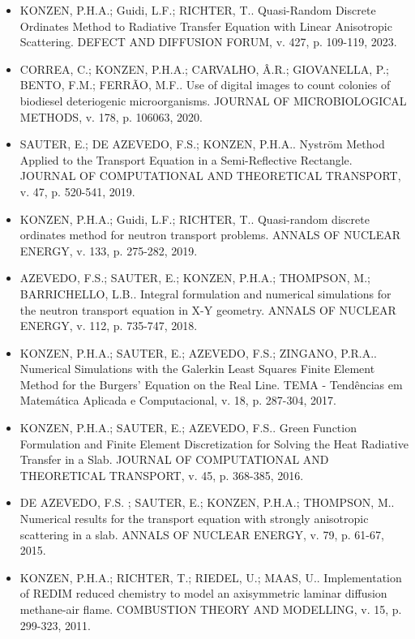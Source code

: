 \documentclass[a4paper,12pt]{article}
\begin{document}
\begin{itemize}
\item KONZEN, P.H.A.; Guidi, L.F.; RICHTER, T.. Quasi-Random Discrete Ordinates Method to Radiative Transfer Equation with Linear Anisotropic Scattering. DEFECT AND DIFFUSION FORUM, v. 427, p. 109-119, 2023.
\item CORREA, C.; KONZEN, P.H.A.; CARVALHO, Â.R.; GIOVANELLA, P.; BENTO, F.M.; FERRÃO, M.F.. Use of digital images to count colonies of biodiesel deteriogenic microorganisms. JOURNAL OF MICROBIOLOGICAL METHODS, v. 178, p. 106063, 2020.
\item SAUTER, E.; DE AZEVEDO, F.S.; KONZEN, P.H.A.. Nyström Method Applied to the Transport Equation in a Semi-Reflective Rectangle. JOURNAL OF COMPUTATIONAL AND THEORETICAL TRANSPORT, v. 47, p. 520-541, 2019.
\item KONZEN, P.H.A.; Guidi, L.F.; RICHTER, T.. Quasi-random discrete ordinates method for neutron transport problems. ANNALS OF NUCLEAR ENERGY, v. 133, p. 275-282, 2019.
\item AZEVEDO, F.S.; SAUTER, E.; KONZEN, P.H.A.; THOMPSON, M.; BARRICHELLO, L.B.. Integral formulation and numerical simulations for the neutron transport equation in X-Y geometry. ANNALS OF NUCLEAR ENERGY, v. 112, p. 735-747, 2018.
\item KONZEN, P.H.A.; SAUTER, E.; AZEVEDO, F.S.; ZINGANO, P.R.A.. Numerical Simulations with the Galerkin Least Squares Finite Element Method for the Burgers' Equation on the Real Line. TEMA - Tendências em Matemática Aplicada e Computacional, v. 18, p. 287-304, 2017.
\item KONZEN, P.H.A.; SAUTER, E.; AZEVEDO, F.S.. Green Function Formulation and Finite Element Discretization for Solving the Heat Radiative Transfer in a Slab. JOURNAL OF COMPUTATIONAL AND THEORETICAL TRANSPORT, v. 45, p. 368-385, 2016.
\item DE AZEVEDO, F.S. ; SAUTER, E.; KONZEN, P.H.A.; THOMPSON, M.. Numerical results for the transport equation with strongly anisotropic scattering in a slab. ANNALS OF NUCLEAR ENERGY, v. 79, p. 61-67, 2015.
\item KONZEN, P.H.A.; RICHTER, T.; RIEDEL, U.; MAAS, U.. Implementation of REDIM reduced chemistry to model an axisymmetric laminar diffusion methane-air flame. COMBUSTION THEORY AND MODELLING, v. 15, p. 299-323, 2011.
\end{itemize}
\end{document}
